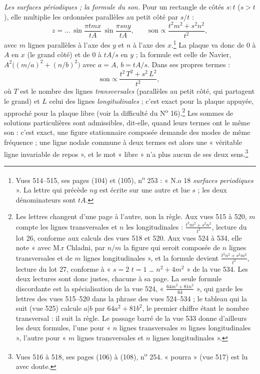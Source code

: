 \documentclass[11pt,a4paper]{article}
\begin{document}
\emph{Les surfaces périodiques ; la formule du son.} Pour un rectangle de côtés
$s:t$ ($s>t$), elle multiplie les ordonnées parallèles au petit côté par
$s/t$ :
\[
z = \dots\,\sin\frac{\pi t m x}{tA}\,\sin\frac{\pi s n y}{tA},
\qquad \text{son} \propto \frac{t^2m^2+s^2n^2}{t^2},
\]
avec $m$ lignes parallèles à l'axe des $y$ et $n$ à l'axe des
$x$.\footnote{Vues 514--515, ses pages (104) et (105), n\textsuperscript{o}
253 : « N.o 18 \emph{surfaces periodiques} ». La lettre qui précède $ny$ est
écrite sur une autre et lue $s$ ; les deux dénominateurs sont $tA$.} La plaque
va donc de $0$ à $A$ en $x$ (le grand côté) et de $0$ à $tA/s$ en $y$ ; la
formule est celle de Navier, $A^2\bigl((m/a)^2+(n/b)^2\bigr)$ avec $a = A$,
$b = tA/s$. Dans ses propres termes :
\[
\text{son} \propto \frac{t^2\,T^2 + s^2\,L^2}{t^2},
\]
où $T$ est le nombre des lignes \emph{transversales} (parallèles au petit côté,
qui partagent le grand) et $L$ celui des lignes \emph{longitudinales} ; c'est
exact pour la plaque appuyée, approché pour la plaque libre (voir la difficulté
du N\textsuperscript{o} 16).\footnote{Les lettres changent d'une page à
l'autre, non la règle. Aux vues 515 à 520, $m$ compte les lignes transversales
et $n$ les longitudinales : $\frac{t^2m^2+s^2n^2}{t^2}$, lecture du lot 26,
conforme aux calculs des vues 518 et 520. Aux vues 524 à 534, elle note « avec
M.r Chladni, par $n/m$ la figure qui seroit composée de $n$ lignes transversales
et de $m$ lignes longitudinales », et la formule devient
$\frac{t^2n^2+s^2m^2}{t^2}$, lecture du lot 27, conforme à « $s=2$ $t=1$ …
$n^2+4m^2$ » de la vue 534. Les deux lectures sont donc justes, chacune à sa
page. La seule formule discordante est la spécialisation de la vue 524,
« $\frac{64m^2+81n^2}{64}$ », qui garde les lettres des vues 515--520 dans la
phrase des vues 524--534 ; le tableau qui la suit (vue 525) calcule $a|b$ par
$64a^2+81b^2$, le premier chiffre étant le nombre transversal : il suit la
règle. Le passage barré de la vue 533 donne d'ailleurs les deux formules, l'une
pour « $n$ lignes transversales $m$ lignes longitudinales », l'autre pour
« $m$ lignes transversales et $n$ lignes longitudinales ».} Les sommes de
solutions particulières sont admissibles, dit-elle, quand leurs termes ont le
même son : c'est exact, une figure stationnaire composée demande des modes de
même fréquence ; une ligne nodale commune à deux termes est alors une
« véritable ligne invariable de repos », et le mot « libre » n'a plus aucun de
ses deux sens.\footnote{Vues 516 à 518, ses pages (106) à (108),
n\textsuperscript{o} 254. « pourra » (vue 517) est lu avec doute.}
\end{document}
